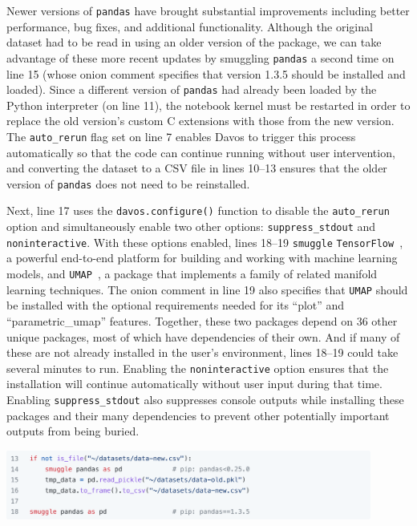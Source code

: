 \documentclass[preprint,12pt,a4paper]{elsarticle}
\begin{document}
Newer versions of \texttt{pandas} have brought substantial improvements
including better performance, bug fixes, and additional functionality. Although
the original dataset had to be read in using an older version of the package,
we can take advantage of these more recent updates by smuggling \texttt{pandas}
a second time on line 15 (whose onion comment specifies that version 1.3.5
should be installed and loaded). Since a different version of \texttt{pandas}
had already been loaded by the Python interpreter (on line 11), the notebook
kernel must be restarted in order to replace the old version's custom C
extensions with those from the new version. The \texttt{auto\_rerun} flag set
on line 7 enables Davos to trigger this process automatically so that
the code can continue running without user intervention, and converting the
dataset to a CSV file in lines 10--13 ensures that the older version of
\texttt{pandas} does not need to be reinstalled.

Next, line 17 uses the \texttt{davos.configure()} function to disable
the \texttt{auto\_rerun} option and simultaneously enable two other
options: \texttt{suppress\_stdout} and \texttt{noninteractive}. With
these options enabled, lines 18--19 \texttt{smuggle}
\texttt{TensorFlow}~\cite{AbadEtal15}, a powerful end-to-end platform
for building and working with machine learning models, and
\texttt{UMAP}~\cite{McInEtal18b}, a package that implements a family
of related manifold learning techniques. The onion comment in line 19
also specifies that \texttt{UMAP} should be installed with the
optional requirements needed for its ``plot'' and ``parametric\_umap''
features. Together, these two packages depend on 36 other unique
packages, most of which have dependencies of their own. And if many of
these are not already installed in the user's environment, lines
18--19 could take several minutes to run.  Enabling the
\texttt{noninteractive} option ensures that the installation will
continue automatically without user input during that time.  Enabling
\texttt{suppress\_stdout} also suppresses console outputs while installing
these packages and their many dependencies to prevent other potentially important outputs from being buried.
\begin{center}
\includegraphics[width=0.9\textwidth]{figs/example4}
\end{center}
\end{document}
